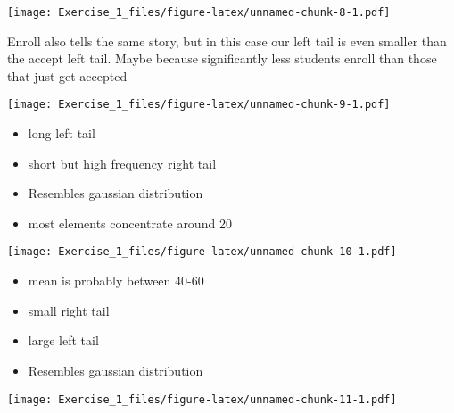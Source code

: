 \documentclass[]{article}
\newenvironment{Shaded}{\begin{snugshade}}{\end{snugshade}}
\newcommand{\CommentTok}[1]{\textcolor[rgb]{0.56,0.35,0.01}{\textit{#1}}}
\newcommand{\KeywordTok}[1]{\textcolor[rgb]{0.13,0.29,0.53}{\textbf{#1}}}
\newcommand{\NormalTok}[1]{#1}
\newcommand{\OperatorTok}[1]{\textcolor[rgb]{0.81,0.36,0.00}{\textbf{#1}}}
\providecommand{\tightlist}{%
  \setlength{\itemsep}{0pt}\setlength{\parskip}{0pt}}
\begin{document}
\texttt{[image: Exercise\_1\_files/figure-latex/unnamed-chunk-8-1.pdf]}

Enroll also tells the same story, but in this case our left tail is even
smaller than the accept left tail. Maybe because significantly less
students enroll than those that just get accepted

\begin{Shaded}
\end{Shaded}

\texttt{[image: Exercise\_1\_files/figure-latex/unnamed-chunk-9-1.pdf]}

\begin{itemize}
\tightlist
\item
  long left tail
\item
  short but high frequency right tail
\item
  Resembles gaussian distribution
\item
  most elements concentrate around 20
\end{itemize}

\begin{Shaded}
\end{Shaded}

\texttt{[image: Exercise\_1\_files/figure-latex/unnamed-chunk-10-1.pdf]}

\begin{itemize}
\tightlist
\item
  mean is probably between 40-60
\item
  small right tail
\item
  large left tail
\item
  Resembles gaussian distribution
\end{itemize}

\begin{Shaded}
\end{Shaded}

\texttt{[image: Exercise\_1\_files/figure-latex/unnamed-chunk-11-1.pdf]}
\end{document}
